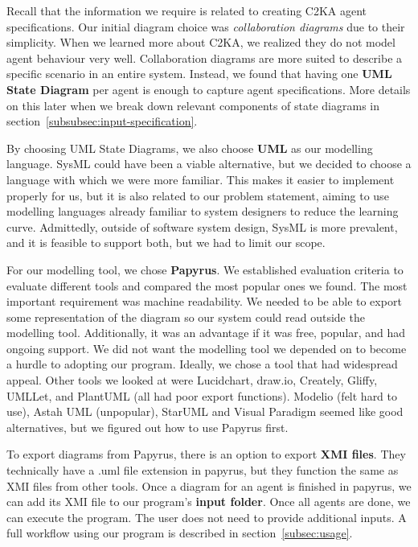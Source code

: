 Recall that the information we require is related to creating C2KA agent specifications.
Our initial diagram choice was \textit{collaboration diagrams} due to their simplicity.
When we learned more about C2KA, we realized they do not model agent behaviour very well.
Collaboration diagrams are more suited to describe a specific scenario in an entire system.
Instead, we found that having one \textbf{UML State Diagram} per agent is enough to capture agent specifications.
More details on this later when we break down relevant components of state diagrams in section~\ref{subsubsec:input-specification}.

By choosing UML State Diagrams, we also choose \textbf{UML} as our modelling language.
SysML could have been a viable alternative, but we decided to choose a language with which we were more familiar.
This makes it easier to implement properly for us,
but it is also related to our problem statement, aiming to use modelling languages already familiar to system designers to reduce the learning curve.
Admittedly, outside of software system design, SysML is more prevalent, and it is feasible to support both, but we had to limit our scope.

For our modelling tool, we chose \textbf{Papyrus}.
We established evaluation criteria to evaluate different tools and compared the most popular ones we found.
The most important requirement was machine readability.
We needed to be able to export some representation of the diagram so our system could read outside the modelling tool.
Additionally, it was an advantage if it was free, popular, and had ongoing support.
We did not want the modelling tool we depended on to become a hurdle to adopting our program.
Ideally, we chose a tool that had widespread appeal.
Other tools we looked at were Lucidchart, draw.io, Creately, Gliffy, UMLLet, and PlantUML (all had poor export functions).
Modelio (felt hard to use), Astah UML (unpopular),
StarUML and Visual Paradigm seemed like good alternatives, but we figured out how to use Papyrus first.

To export diagrams from Papyrus, there is an option to export \textbf{XMI files}.
They technically have a .uml file extension in papyrus, but they function the same as XMI files from other tools.
Once a diagram for an agent is finished in papyrus, we can add its XMI file to our program's \textbf{input folder}.
Once all agents are done, we can execute the program.
The user does not need to provide additional inputs.
A full workflow using our program is described in section~\ref{subsec:usage}.

